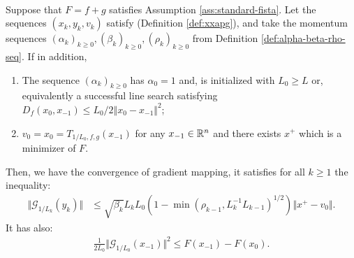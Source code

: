 \documentclass[12pt]{report}
\begin{document}
        \begin{theorem}\;\label{thm:xxapg-gm-cnvg}\\
            Suppose that $F = f + g$ satisfies Assumption \ref{ass:standard-fista}. 
            Let the sequences $(x_k, y_k, v_k)$ satisfy \XXAPG{} (Definition \ref{def:xxapg}), and take the momentum sequences $(\alpha_k)_{k \ge 0}, (\beta_k)_{k \ge 0}, (\rho_k)_{k \ge 0}$ from Definition \ref{def:alpha-beta-rho-seq}. 
            If in addition, 
            \begin{enumerate}
                \item The sequence $(\alpha_k)_{k \ge 0}$ has $\alpha_0 = 1$ and, \XXAPG{} is initialized with $L_0 \ge L$ or, equivalently a successful line search satisfying \mbox{$D_f(x_{0}, x_{-1}) \le L_0/2\Vert x_{0} - x_{-1}\Vert^2$};
                \item $v_0=x_0 = T_{1/L_0, f, g}(x_{-1})$ for any $x_{-1} \in\mathbb R^n$ and there exists $x^+$ which is a minimizer of $F$. 
            \end{enumerate}
            Then, we have the convergence of gradient mapping, it satisfies for all $k \ge 1$ the inequality:
            \begin{align}\label{ineq:xxapg-gm-cnvg-prt1}
                \Vert \mathcal G_{1/L_k} (y_k)\Vert &\le 
                \sqrt{\beta_k}L_k L_0 \left(
                    1 - 
                    \min(\rho_{k - 1}, L_k^{-1} L_{k - 1})^{1/2}
                \right)\Vert x^+ - v_0\Vert. 
            \end{align}
            It has also:
            \begin{align}\label{ineq:xxapg-gm-cnvg-prt2}
                \frac{1}{2L_0}\Vert \mathcal G_{1/L_0}(x_{-1}) \Vert^2
                \le F(x_{-1}) - F(x_0). 
            \end{align}
        \end{theorem}
\end{document}
